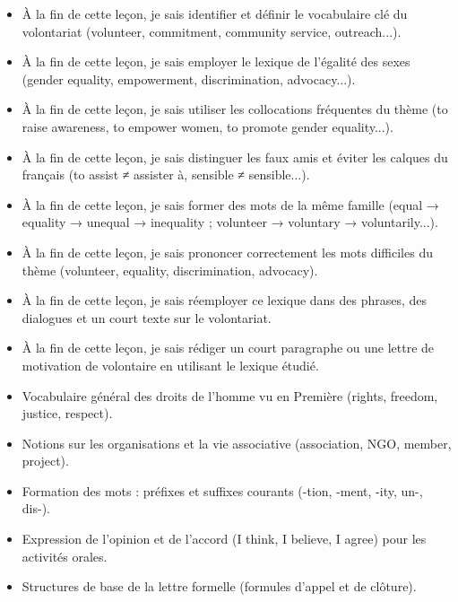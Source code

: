 \documentclass[11pt]{article}
\begin{document}
\begin{objectifs}
\begin{itemize}
\item À la fin de cette leçon, je sais identifier et définir le vocabulaire clé du volontariat (volunteer, commitment, community service, outreach...).
\item À la fin de cette leçon, je sais employer le lexique de l'égalité des sexes (gender equality, empowerment, discrimination, advocacy...).
\item À la fin de cette leçon, je sais utiliser les collocations fréquentes du thème (to raise awareness, to empower women, to promote gender equality...).
\item À la fin de cette leçon, je sais distinguer les faux amis et éviter les calques du français (to assist ≠ assister à, sensible ≠ sensible...).
\item À la fin de cette leçon, je sais former des mots de la même famille (equal → equality → unequal → inequality ; volunteer → voluntary → voluntarily...).
\item À la fin de cette leçon, je sais prononcer correctement les mots difficiles du thème (volunteer, equality, discrimination, advocacy).
\item À la fin de cette leçon, je sais réemployer ce lexique dans des phrases, des dialogues et un court texte sur le volontariat.
\item À la fin de cette leçon, je sais rédiger un court paragraphe ou une lettre de motivation de volontaire en utilisant le lexique étudié.
\end{itemize}
\end{objectifs}

\begin{prerequis}
\begin{itemize}
\item Vocabulaire général des droits de l'homme vu en Première (rights, freedom, justice, respect).
\item Notions sur les organisations et la vie associative (association, NGO, member, project).
\item Formation des mots : préfixes et suffixes courants (-tion, -ment, -ity, un-, dis-).
\item Expression de l'opinion et de l'accord (I think, I believe, I agree) pour les activités orales.
\item Structures de base de la lettre formelle (formules d'appel et de clôture).
\end{itemize}
\end{prerequis}
\end{document}
